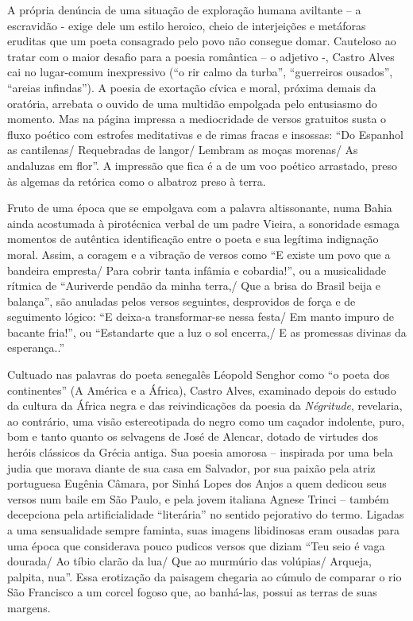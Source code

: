 \documentclass[
  letterpaper,
  DIV=11,
  numbers=noendperiod]{scrreprt}
\begin{document}
A própria denúncia de uma situação de exploração humana aviltante -- a
escravidão - exige dele um estilo heroico, cheio de interjeições e
metáforas eruditas que um poeta consagrado pelo povo não consegue domar.
Cauteloso ao tratar com o maior desafio para a poesia romântica -- o
adjetivo -, Castro Alves cai no lugar-comum inexpressivo (``o rir calmo
da turba'', ``guerreiros ousados'', ``areias infindas''). A poesia de
exortação cívica e moral, próxima demais da oratória, arrebata o ouvido
de uma multidão empolgada pelo entusiasmo do momento. Mas na página
impressa a mediocridade de versos gratuitos susta o fluxo poético com
estrofes meditativas e de rimas fracas e insossas: ``Do Espanhol as
cantilenas/ Requebradas de langor/ Lembram as moças morenas/ As
andaluzas em flor''. A impressão que fica é a de um voo poético
arrastado, preso às algemas da retórica como o albatroz preso à terra.

Fruto de uma época que se empolgava com a palavra altissonante, numa
Bahia ainda acostumada à pirotécnica verbal de um padre Vieira, a
sonoridade esmaga momentos de autêntica identificação entre o poeta e
sua legítima indignação moral. Assim, a coragem e a vibração de versos
como ``E existe um povo que a bandeira empresta/ Para cobrir tanta
infâmia e cobardia!'', ou a musicalidade rítmica de ``Auriverde pendão
da minha terra,/ Que a brisa do Brasil beija e balança'', são anuladas
pelos versos seguintes, desprovidos de força e de seguimento lógico: ``E
deixa-a transformar-se nessa festa/ Em manto impuro de bacante fria!'',
ou ``Estandarte que a luz o sol encerra,/ E as promessas divinas da
esperança..''

Cultuado nas palavras do poeta senegalês Léopold Senghor como ``o poeta
dos continentes'' (A América e a África), Castro Alves, examinado depois
do estudo da cultura da África negra e das reivindicações da poesia da
\emph{Négritude}, revelaria, ao contrário, uma visão estereotipada do
negro como um caçador indolente, puro, bom e tanto quanto os selvagens
de José de Alencar, dotado de virtudes dos heróis clássicos da Grécia
antiga. Sua poesia amorosa -- inspirada por uma bela judia que morava
diante de sua casa em Salvador, por sua paixão pela atriz portuguesa
Eugênia Câmara, por Sinhá Lopes dos Anjos a quem dedicou seus versos num
baile em São Paulo, e pela jovem italiana Agnese Trinci -- também
decepciona pela artificialidade ``literária'' no sentido pejorativo do
termo. Ligadas a uma sensualidade sempre faminta, suas imagens
libidinosas eram ousadas para uma época que considerava pouco pudicos
versos que diziam ``Teu seio é vaga dourada/ Ao tíbio clarão da lua/ Que
ao murmúrio das volúpias/ Arqueja, palpita, nua''. Essa erotização da
paisagem chegaria ao cúmulo de comparar o rio São Francisco a um corcel
fogoso que, ao banhá-las, possui as terras de suas margens.
\end{document}
